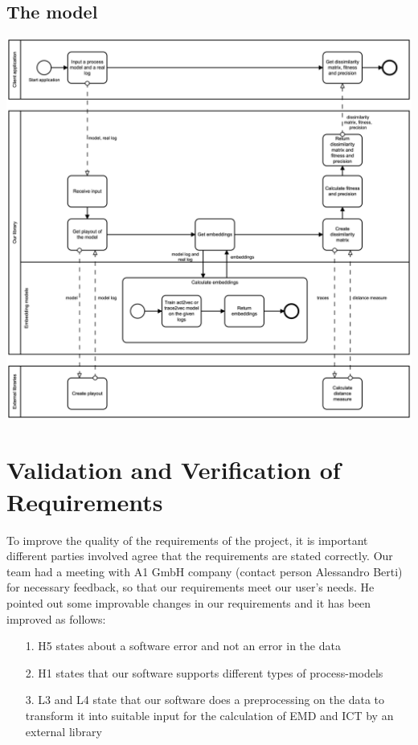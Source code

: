 \documentclass{article}
\begin{document}
\subsection{The model}
\includegraphics[width=\textwidth]{functional-model.png}

\section{Validation and Verification of Requirements}
To improve the quality of the requirements of the project, it is important different parties involved agree that the requirements are stated correctly. Our team had a meeting with A1 GmbH company (contact person Alessandro Berti) for necessary feedback, so that our requirements meet our user's needs. He pointed out some improvable changes in our requirements and it has been improved as follows:
\begin{enumerate}
    \item [1.]  H5 states about a software error and not an error in the data
    \item [2.] H1 states that our software     supports different types of process-models
    \item [3.] L3 and L4 state that our software does a preprocessing on the data to transform it into suitable input for the calculation of EMD and ICT by an external library
\end{enumerate}
\end{document}
